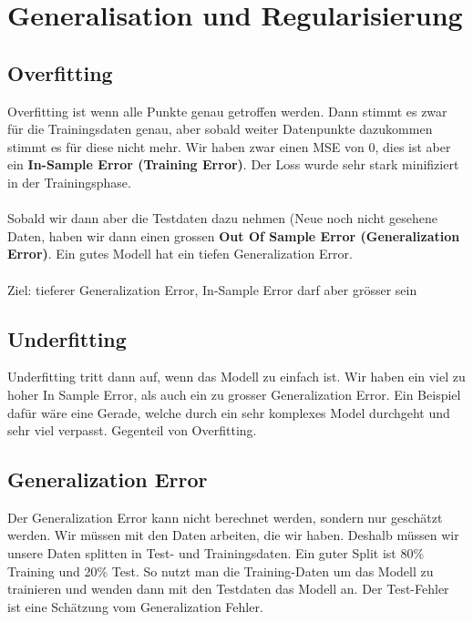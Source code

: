 \section{Generalisation und Regularisierung}
\subsection{Overfitting}
Overfitting ist wenn alle Punkte genau getroffen werden. Dann stimmt es zwar für die Trainingsdaten genau, aber sobald weiter Datenpunkte dazukommen stimmt es für diese nicht mehr. Wir haben zwar einen MSE von 0, dies ist aber ein \textbf{In-Sample Error (Training Error)}. Der Loss wurde sehr stark minifiziert in der Trainingsphase.\\
\\
Sobald wir dann aber die Testdaten dazu nehmen (Neue noch nicht gesehene Daten, haben wir dann einen grossen \textbf{Out Of
Sample Error (Generalization Error)}. Ein gutes Modell hat ein tiefen Generalization Error.\\
\\
Ziel: tieferer Generalization Error, In-Sample Error darf aber grösser sein
\subsection{Underfitting}
Underfitting tritt dann auf, wenn das Modell zu einfach ist. Wir haben ein viel zu hoher In Sample Error, als auch ein zu grosser Generalization Error. Ein Beispiel dafür wäre eine Gerade, welche durch ein sehr komplexes Model durchgeht und sehr viel verpasst. Gegenteil von Overfitting.
\subsection{Generalization Error}
Der Generalization Error kann nicht berechnet werden, sondern nur geschätzt werden. Wir müssen mit den Daten arbeiten, die wir haben. Deshalb müssen wir unsere Daten splitten in Test- und Trainingsdaten. Ein guter Split ist 80\% Training und 20\% Test. So nutzt man die Training-Daten um das Modell zu trainieren und wenden dann mit den Testdaten das Modell an. Der Test-Fehler ist eine Schätzung vom Generalization Fehler.
